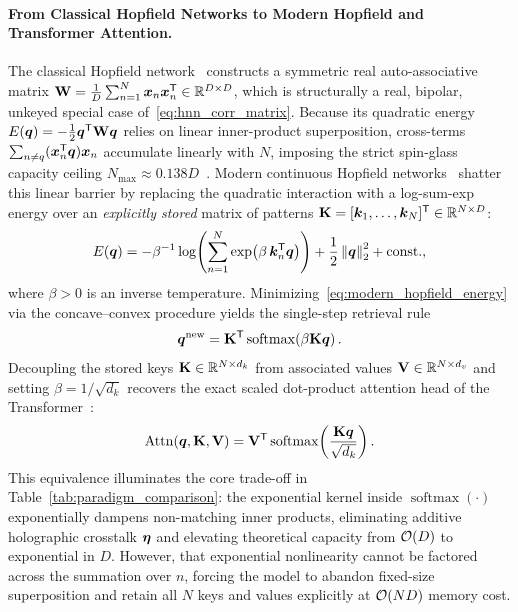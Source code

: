 \paragraph{From Classical Hopfield Networks to Modern Hopfield and Transformer Attention.}
The classical Hopfield network~\cite{HOPFIELD_1982_ASSOCIATIVE} constructs a symmetric real auto-associative matrix $\mathbf{W} = \frac{1}{D}\sum_{n=1}^N \boldsymbol{x}_n \boldsymbol{x}_n^{\mathsf{T}} \in \mathbb{R}^{D \times D}$, which is structurally a real, bipolar, unkeyed special case of~\eqref{eq:hnn_corr_matrix}.
Because its quadratic energy $E(\boldsymbol{q}) = -\frac{1}{2}\boldsymbol{q}^{\mathsf{T}}\mathbf{W}\boldsymbol{q}$ relies on linear inner-product superposition, cross-terms $\sum_{n \neq q} (\boldsymbol{x}_n^{\mathsf{T}} \boldsymbol{q})\boldsymbol{x}_n$ accumulate linearly with $N$, imposing the strict spin-glass capacity ceiling $N_{\max} \approx 0.138 D$~\cite{AMIT_1985_HOPFIELD_CAPACITY}.
Modern continuous Hopfield networks~\cite{RAMSAUER_MODERN_HOPFIELD} shatter this linear barrier by replacing the quadratic interaction with a log-sum-exp energy over an \emph{explicitly stored} matrix of patterns $\mathbf{K} = [\boldsymbol{k}_1, \dots, \boldsymbol{k}_N]^{\mathsf{T}} \in \mathbb{R}^{N \times D}$:
\begin{equation}\label{eq:modern_hopfield_energy}
    E(\boldsymbol{q}) = -\beta^{-1}\log\!\left(\sum_{n=1}^{N} \exp\!\left(\beta\,\boldsymbol{k}_n^{\mathsf{T}}\boldsymbol{q}\right)\right) + \frac{1}{2}\left\lVert \boldsymbol{q} \right\rVert_2^2 + \text{const.},
\end{equation}
where $\beta > 0$ is an inverse temperature.
Minimizing~\eqref{eq:modern_hopfield_energy} via the concave--convex procedure yields the single-step retrieval rule
\begin{equation}\label{eq:modern_hopfield_update}
    \boldsymbol{q}^{\text{new}} = \mathbf{K}^{\mathsf{T}} \operatorname{softmax}\!\left(\beta \mathbf{K}\boldsymbol{q}\right).
\end{equation}
Decoupling the stored keys $\mathbf{K} \in \mathbb{R}^{N \times d_k}$ from associated values $\mathbf{V} \in \mathbb{R}^{N \times d_v}$ and setting $\beta = 1/\sqrt{d_k}$ recovers the exact scaled dot-product attention head of the Transformer~\cite{VASWANI_TRANSFORMER}:
\begin{equation}\label{eq:transformer_attn}
    \operatorname{Attn}(\boldsymbol{q}, \mathbf{K}, \mathbf{V}) = \mathbf{V}^{\mathsf{T}} \operatorname{softmax}\!\left(\frac{\mathbf{K}\boldsymbol{q}}{\sqrt{d_k}}\right).
\end{equation}
This equivalence illuminates the core trade-off in Table~\ref{tab:paradigm_comparison}: the exponential kernel inside $\operatorname{softmax}(\cdot)$ exponentially dampens non-matching inner products, eliminating additive holographic crosstalk $\boldsymbol{\eta}$ and elevating theoretical capacity from $\mathcal{O}\!\left(D\right)$ to exponential in $D$.
However, that exponential nonlinearity cannot be factored across the summation over $n$, forcing the model to abandon fixed-size superposition and retain all $N$ keys and values explicitly at $\mathcal{O}\!\left(ND\right)$ memory cost.

